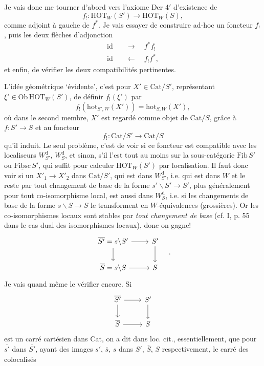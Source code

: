 \documentclass[11pt]{article}
\newcommand{\printedpage}[1]{\marginpar{\footnotesize p.~#1}}
\newcommand{\msp}[1]{\marginpar{\footnotesize [#1]}}
\newcommand{\HOT}{\mathrm{HOT}}
\newcommand{\Cat}{\mathrm{Cat}}
\newcommand{\Ob}{\mathrm{Ob}}
\newcommand{\hot}{\mathrm{hot}}
\newcommand{\uFib}{\underline{\mathrm{Fib}}}
\newcommand{\uFibsc}{\underline{\mathrm{Fibsc}}}
\begin{document}
Je vais donc me tourner d'abord vers l'axiome Der 4$'$ d'existence de
\[ f_! : \HOT_W(S') \longrightarrow \HOT_W(S), \]
comme adjoint à gauche de $f^*$. Je vais essayer de construire ad-hoc un foncteur $f_!$, puis les deux flèches d'adjonction
\[ \begin{aligned} \mathrm{id} &\quad\longrightarrow\quad f^*f_! \\ \mathrm{id} &\quad\longleftarrow\quad f_!f^*, \end{aligned} \]
et enfin, de vérifier les deux compatibilités pertinentes.

L'idée géométrique `évidente', c'est pour $X'\in\Cat/S'$, représentant $\xi'\in\Ob\,\HOT_W(S')$, de définir $f_!(\xi')$ par
\[ f_!(\hot_{S',W}(X')) = \hot_{S,W}(X'), \]
où dans le second membre, $X'$ est regardé comme objet de $\Cat/S$, grâce à $f:S'\longrightarrow S$ et au foncteur
\[ f_! : \Cat/S' \longrightarrow \Cat/S \]
qu'il induit. Le seul problème, c'est de voir si ce foncteur est compatible avec les
\msp{page 135}
localiseurs $W_{S'}^{\mathrm{d}}$, $W_S^{\mathrm{d}}$, et sinon, s'il l'est tout au moins sur la sous-catégorie $\uFib\,S'$ ou $\uFibsc\,S'$, qui suffit pour calculer $\HOT_W(S')$ par localisation. Il faut donc voir si un $X'_1\longrightarrow X'_2$ dans $\Cat/S'$, qui est dans $W_{S'}^{\mathrm{d}}$, i.e. qui est dans $W$ et le reste par tout changement de base de la forme $s'\backslash S'\longrightarrow S'$, plus généralement pour tout co-isomorphisme local, est aussi dans $W_S^{\mathrm{d}}$, i.e. si les changements de base de la forme $s\backslash S\longrightarrow S$ le transforment en $W$-équivalences (grossières). Or les co-isomorphismes locaux sont stables par \textit{tout changement de base} (cf. I, p. 55 dans le cas dual des isomorphismes locaux), donc on gagne!
\[
\begin{tikzcd}
\overline{S'} = s\backslash S' \arrow[r] \arrow[d] & S' \arrow[d] \\
\overline{S} = s\backslash S \arrow[r] & S
\end{tikzcd}
\quad .
\]
Je vais quand même le vérifier encore. Si
\[
\begin{tikzcd}
\overline{S'} \arrow[r] \arrow[d] & S' \arrow[d] \\
\overline{S} \arrow[r] & S
\end{tikzcd}
\]
\printedpage{83}
est un carré cartésien dans Cat, on a dit dans loc. cit., essentiellement, que pour $\overline{s'}$ dans $\overline{S'}$, ayant des images $s'$, $\overline{s}$, $s$ dans $S'$, $\overline{S}$, $S$ respectivement, le carré des colocalisés
\end{document}
